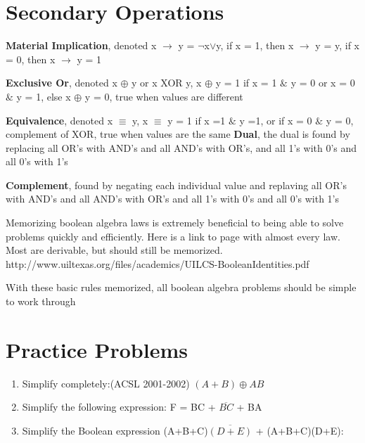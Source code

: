 \documentclass{article}
\begin{document}
\section{Secondary Operations}

\textbf{Material Implication}, denoted  x $\rightarrow$ y = $\neg$x$\lor$y, if x = 1, then x $\rightarrow$ y = y, if x = 0, then x $\rightarrow$ y = 1

\noindent
\textbf{Exclusive Or}, denoted x $\oplus$ y or x XOR y, x $\oplus$ y = 1 if x = 1 $\&$ y = 0 or x = 0 $\&$ y = 1, else x $\oplus$ y = 0, true when values are different

\noindent
\textbf{Equivalence}, denoted x $\equiv$ y, x $\equiv$ y = 1 if x =1 $\&$ y =1, or if x = 0 $\&$ y = 0, complement of XOR, true when values are the same
\noindent
\textbf{Dual}, the dual is found by replacing all OR's with AND's and all AND's with OR's, and all 1's with 0's and all 0's with 1's

\noindent
\textbf{Complement}, found by negating each individual value and replaving all OR's with AND's and all AND's with OR's and all 1's with 0's and all 0's with 1's
\bigskip

\noindent
Memorizing boolean algebra laws is extremely beneficial to being able to solve problems quickly and efficiently. Here is a link to page with almost every law. Most are derivable, but should still be memorized.  http://www.uiltexas.org/files/academics/UILCS-BooleanIdentities.pdf

\bigskip

\noindent
With these basic rules memorized, all boolean algebra problems should be simple to work through

\section{Practice Problems}
\begin{enumerate}
\item Simplify completely:(ACSL 2001-2002)
$( A + B )\oplus A B$

\item Simplify the following expression: F = BC + $\overline{BC}$ + BA

\item Simplify the Boolean expression (A+B+C)$\overline{(D+E)}$ + (A+B+C)(D+E):
\end{enumerate}
\end{document}
